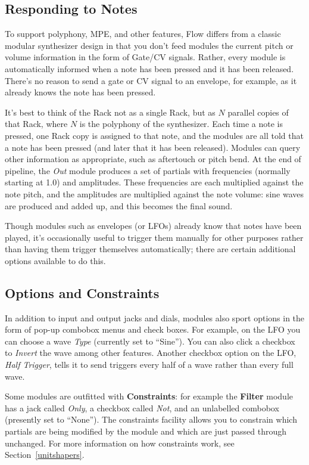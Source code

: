 \documentclass{article}
\newcommand\name{Flow}
\begin{document}
\subsection{Responding to Notes} To support polyphony, MPE, and other features, {\name} differs from a classic modular synthesizer design in that you don't feed modules the current pitch or volume information in the form of Gate/CV signals. Rather, every module is automatically informed when a note has been pressed and it has been released.  There's no reason to send a gate or CV signal to an envelope, for example, as it already knows the note has been pressed.

It's best to think of the Rack not as a single Rack, but as \(N\) parallel copies of that Rack, where \(N\) is the polyphony of the synthesizer.  Each time a note is pressed, one Rack copy is assigned to that note, and the modules are all told that a note has been pressed (and later that it has been released).  Modules can query other information as appropriate, such as aftertouch or pitch bend.  At the end of pipeline, the {\it Out} module produces a set of partials with frequencies (normally starting at 1.0) and amplitudes.  These frequencies are each multiplied against the note pitch, and the amplitudes are multiplied against the note volume: sine waves are produced and added up, and this becomes the final sound.

Though modules such as envelopes (or LFOs) already know that notes have been played, it's occasionally useful to trigger them manually for other purposes rather than having them trigger themselves automatically; there are certain additional options available to do this.

\subsection{Options and Constraints}

In addition to input and output jacks and dials, modules also sport options in the form of pop-up combobox menus and check boxes.  For example, on the LFO you can choose a wave {\it Type} (currently set to ``Sine'').  You can also click a checkbox to {\it Invert} the wave among other features.  Another checkbox option on the LFO, {\it Half Trigger}, tells it to send triggers every half of a wave rather than every full wave.

Some modules are outfitted with {\bf Constraints}: for example the {\bf Filter} module has a jack called {\it Only}, a checkbox called {\it Not}, and an unlabelled combobox (presently set to ``None'').  The constraints facility allows you to constrain which partials are being modified by the module and which are just passed through unchanged.  For more information on how constraints work, see Section~\ref{unitshapers}.
\end{document}
